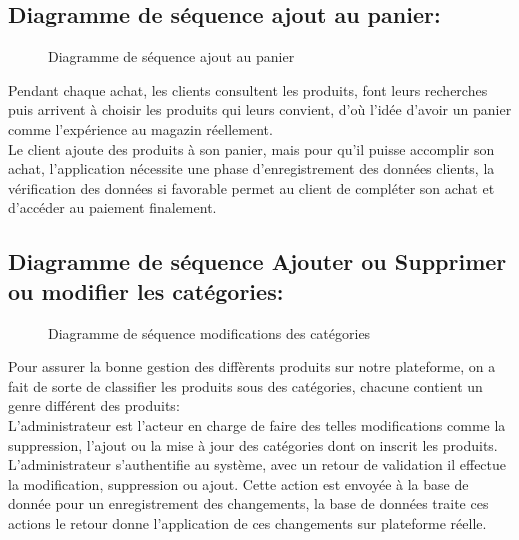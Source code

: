 \documentclass[a4paper]{report}
\begin{document}
\begin{doublespace}
\begin{doublespace}
\begin{doublespace}
\begin{doublespace}
\begin{doublespace}
                    \subsection{Diagramme de séquence ajout au panier:}
                    \begin{figure}[H]
                        \begin{center}
                            \caption{Diagramme de séquence ajout au panier}
                        \end{center}
                    \end{figure}
                    Pendant chaque achat, les clients consultent les produits, font leurs recherches puis arrivent à choisir les produits qui leurs convient, d'où l'idée d'avoir un panier comme l'expérience au magazin réellement. \\Le client ajoute des produits à son panier, mais pour qu'il puisse accomplir son achat, l'application nécessite une phase d'enregistrement des données clients, la vérification des données si favorable permet au client de compléter son achat et d'accéder au paiement finalement.

                    \subsection{Diagramme de séquence Ajouter ou Supprimer ou modifier les catégories:}
                    \begin{figure}[H]
                        \begin{center}
                            \caption{Diagramme de séquence modifications des catégories}
                        \end{center}
                    \end{figure}
                    Pour assurer la bonne gestion des diffèrents produits sur notre plateforme, on a fait de sorte de classifier les produits sous des catégories, chacune contient un genre différent des produits:\\ L'administrateur est l'acteur en charge de faire des telles modifications comme la suppression, l'ajout ou la mise à jour des catégories dont on inscrit les produits. L'administrateur s'authentifie au système, avec un retour de validation il effectue la modification, suppression ou ajout. Cette action est envoyée à la base de donnée pour un enregistrement des changements, la base de données traite ces actions le retour donne l'application de ces changements sur plateforme réelle.

\end{doublespace}
\end{doublespace}
\end{doublespace}
\end{doublespace}
\end{doublespace}
\end{document}
